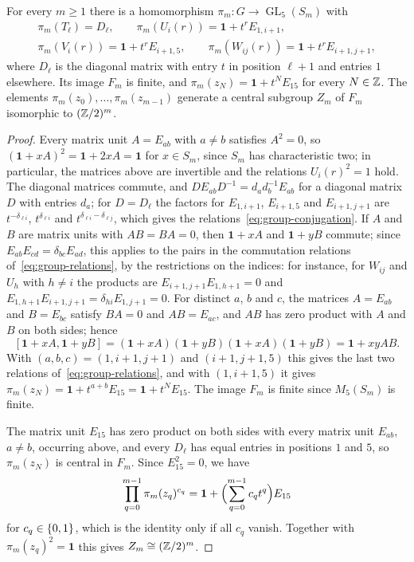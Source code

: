 \begin{proposition}
  \label{prop:finite-quotients}
  For every ${m\geq1}$ there is a homomorphism
  ${\pi_m\colon G\to\operatorname{GL}_5(S_m)}$ with
  \[
    \begin{gathered}
      \pi_m(T_\ell)=D_\ell,\qquad\pi_m(U_i(r))=\mathbf{1}+t^rE_{1,i+1},\\
      \pi_m(V_i(r))=\mathbf{1}+t^rE_{i+1,5},\qquad
      \pi_m(W_{ij}(r))=\mathbf{1}+t^rE_{i+1,j+1},
    \end{gathered}
  \]
  where $D_\ell$ is the diagonal matrix with entry $t$ in position ${\ell+1}$ and
  entries $1$ elsewhere. Its image $F_m$ is finite, and
  ${\pi_m(z_N)=\mathbf{1}+t^NE_{15}}$ for every ${N\in\mathbb{Z}}$. The elements
  $\pi_m(z_0),\dots,\pi_m(z_{m-1})$ generate a central subgroup $Z_m$ of $F_m$
  isomorphic to $(\mathbb{Z}/2)^m$.
\end{proposition}

\begin{proof}
  Every matrix unit ${A=E_{ab}}$ with ${a\neq b}$ satisfies ${A^2=0}$, so
  ${(\mathbf{1}+xA)^2}={\mathbf{1}+2xA}={\mathbf{1}}$ for ${x\in S_m}$, since $S_m$ has
  characteristic two; in particular,
  the matrices above are invertible and the relations ${U_i(r)^2=1}$ hold. The
  diagonal matrices commute, and ${DE_{ab}D^{-1}}={d_ad_b^{-1}E_{ab}}$ for a
  diagonal matrix $D$ with entries $d_a$; for ${D=D_\ell}$ the factors for
  $E_{1,i+1}$, $E_{i+1,5}$ and $E_{i+1,j+1}$ are $t^{-\delta_{\ell i}}$,
  $t^{\delta_{\ell i}}$ and $t^{\delta_{\ell i}-\delta_{\ell j}}$, which gives
  the relations~\eqref{eq:group-conjugation}. If $A$ and $B$ are matrix units
  with ${AB=BA=0}$, then ${\mathbf{1}+xA}$ and ${\mathbf{1}+yB}$ commute; since
  ${E_{ab}E_{cd}=\delta_{bc}E_{ad}}$, this applies to the pairs in the
  commutation relations of~\eqref{eq:group-relations}, by the restrictions on
  the indices: for instance, for $W_{ij}$ and $U_h$ with ${h\neq i}$ the
  products are ${E_{i+1,j+1}E_{1,h+1}=0}$ and
  ${E_{1,h+1}E_{i+1,j+1}}={\delta_{hi}E_{1,j+1}}={0}$. For distinct $a$, $b$ and $c$,
  the matrices ${A=E_{ab}}$ and ${B=E_{bc}}$ satisfy ${BA=0}$ and ${AB=E_{ac}}$, and
  $AB$ has zero product with $A$ and $B$ on both sides; hence
  \[
    [\mathbf{1}+xA,\mathbf{1}+yB]=(\mathbf{1}+xA)(\mathbf{1}+yB)
    (\mathbf{1}+xA)(\mathbf{1}+yB)=\mathbf{1}+xyAB.
  \]
  With ${(a,b,c)=(1,i+1,j+1)}$ and ${(i+1,j+1,5)}$ this gives the last two
  relations of~\eqref{eq:group-relations}, and with ${(1,i+1,5)}$ it gives
  ${\pi_m(z_N)=\mathbf{1}+t^{a+b}E_{15}=\mathbf{1}+t^NE_{15}}$. The image $F_m$ is
  finite since $M_5(S_m)$ is finite.

  The matrix unit $E_{15}$ has zero product on both sides with every matrix unit
  $E_{ab}$, ${a\neq b}$, occurring above, and every $D_\ell$ has equal entries
  in positions $1$ and $5$, so $\pi_m(z_N)$ is central in $F_m$. Since
  ${E_{15}^2=0}$, we have
  \[
    \prod_{q=0}^{m-1}\pi_m(z_q)^{c_q}
    =\mathbf{1}+\Bigl(\sum_{q=0}^{m-1}c_qt^q\Bigr)E_{15}
  \]
  for ${c_q\in\set{0,1}}$, which is the identity only if all $c_q$ vanish.
  Together with ${\pi_m(z_q)^2=\mathbf{1}}$ this gives
  ${Z_m\cong(\mathbb{Z}/2)^m}$.
\end{proof}

